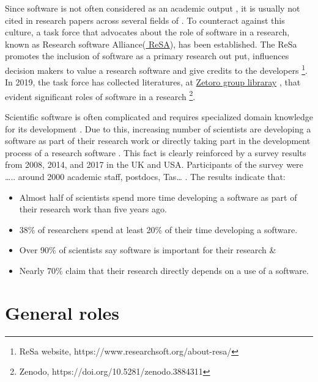Since software is not often considered as an academic output \citep{yang2018important, pan2016disciplinary}, it is usually not cited in research papers across several fields of \cite{pan2016disciplinary}. To counteract against this culture, a task force that advocates about the role of software in a research, known as Research software Alliance(\href{https://www.researchsoft.org/}{ ReSA}), has been established. The ReSa promotes the inclusion of software as a primary research out put, influences decision makers to value a research software and give credits to the developers \footnote{ReSa website, https://www.researchsoft.org/about-resa/}. In 2019, the task force has collected literatures, at \href{https://www.zotero.org/groups/2400609/resa/library}{Zetoro group libraray} , that evident significant roles of software in a research \footnote{Zenodo, https://doi.org/10.5281/zenodo.3884311 }.  

Scientific software is often complicated and requires specialized domain knowledge for its development \citep{wilson2014best}. Due to this, increasing number of scientists are developing a software as part of their research work or directly taking part in the development process of a research software \citep{jimenez2017four, kanewala2014testing}. This fact is clearly reinforced by a  survey results  from 2008, 2014, and 2017  in the UK and USA. Participants of the survey were ….. around 2000 academic staff, postdocs, Tas… \citep{merali2010computational, hettrick2014uk, nangia2017track}.  The results indicate that:


\begin{itemize}%
	\item Almost half of scientists spend more time developing a software as part of their research work than five years ago.
	\item 38\% of researchers spend at least 20\% of their time developing a software.
	\item Over 90\% of scientists say software is important for their research \&
	\item Nearly 70\% claim that their research directly depends on a use of a software.  

\end{itemize}




\section{General roles}
\label{subsec:background:first_section:first_subsection}

